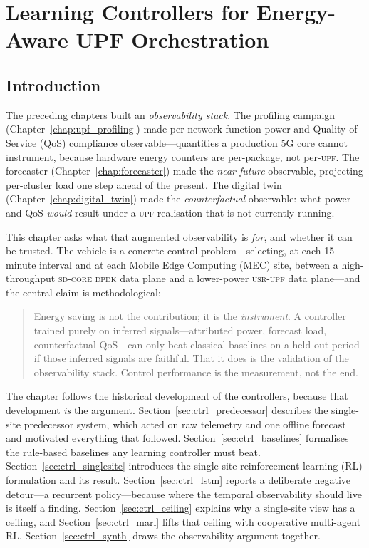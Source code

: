 \documentclass[12pt, a4paper]{report}
\newcommand{\dpdk}{\textsc{sd-core dpdk}}
\newcommand{\usr}{\textsc{usr-upf}}
\newcommand{\upf}{\textsc{upf}}
\begin{document}

\chapter{Learning Controllers for Energy-Aware UPF Orchestration}
\label{chap:controllers}

\section{Introduction}
\label{sec:ctrl_intro}

The preceding chapters built an \emph{observability stack}. The profiling
campaign (Chapter~\ref{chap:upf_profiling}) made per-network-function power and
Quality-of-Service (QoS) compliance observable---quantities a production 5G core
cannot instrument, because hardware energy counters are per-package, not
per-\upf{}. The forecaster (Chapter~\ref{chap:forecaster}) made the
\emph{near future} observable, projecting per-cluster load one step ahead of the
present. The digital twin (Chapter~\ref{chap:digital_twin}) made the
\emph{counterfactual} observable: what power and QoS \emph{would} result under a
\upf{} realisation that is not currently running.

This chapter asks what that augmented observability is \emph{for}, and whether it
can be trusted. The vehicle is a concrete control problem---selecting, at each
15-minute interval and at each Mobile Edge Computing (MEC) site, between a
high-throughput \dpdk{} data plane and a lower-power \usr{} data plane---and the
central claim is methodological:

\begin{quote}
Energy saving is not the contribution; it is the \emph{instrument}. A controller
trained purely on inferred signals---attributed power, forecast load,
counterfactual QoS---can only beat classical baselines on a held-out period if
those inferred signals are faithful. That it does is the validation of the
observability stack. Control performance is the measurement, not the end.
\end{quote}

The chapter follows the historical development of the controllers, because that
development \emph{is} the argument. Section~\ref{sec:ctrl_predecessor} describes
the single-site predecessor system, which acted on raw telemetry and one offline
forecast and motivated everything that followed. Section~\ref{sec:ctrl_baselines}
formalises the rule-based baselines any learning controller must beat.
Section~\ref{sec:ctrl_singlesite} introduces the single-site reinforcement
learning (RL) formulation and its result. Section~\ref{sec:ctrl_lstm} reports a
deliberate negative detour---a recurrent policy---because where the temporal
observability should live is itself a finding. Section~\ref{sec:ctrl_ceiling}
explains why a single-site view has a ceiling, and Section~\ref{sec:ctrl_marl}
lifts that ceiling with cooperative multi-agent RL. Section~\ref{sec:ctrl_synth}
draws the observability argument together.
\end{document}
